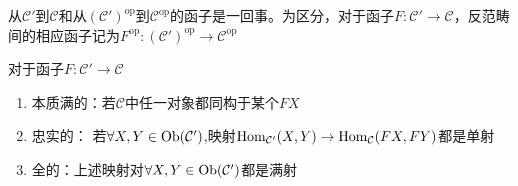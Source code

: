 \begin{Rmk}
    从$\mathcal{C'}$到$\mathcal{C}$和从$(\mathcal{C}')^{\text{op}}$到$\mathcal{C}^{\text{op}}$的函子是一回事。为区分，对于函子$F:\mathcal{C}'\rightarrow \mathcal{C}$，反范畴间的相应函子记为$F^{\text{op}}:(\mathcal{C}')^{\text{op}}\rightarrow \mathcal{C}^{\text{op}}$
\end{Rmk}

\begin{Def}
    对于函子$F:\mathcal{C}'\rightarrow \mathcal{C}$
    \begin{enumerate}
        \item 本质满的：若$\mathcal{C}$中任一对象都同构于某个$FX$
        \item 忠实的： 若$\forall X,Y\in \operatorname{Ob}(\mathcal{C}')$,映射$\operatorname{Hom}_{\mathcal{C}'}(X,Y)\rightarrow \operatorname{Hom}_{\mathcal{C}}(FX,FY)$都是单射
        \item 全的：上述映射对$\forall X,Y\in \operatorname{Ob}(\mathcal{C}')$都是满射
    \end{enumerate}
\end{Def}

